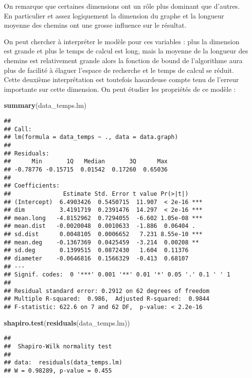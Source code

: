 \documentclass[
]{article}
\newenvironment{Shaded}{\begin{snugshade}}{\end{snugshade}}
\newcommand{\KeywordTok}[1]{\textcolor[rgb]{0.13,0.29,0.53}{\textbf{#1}}}
\newcommand{\NormalTok}[1]{#1}
\begin{document}
On remarque que certaines dimensions ont un rôle plus dominant que
d'autres. En particulier et assez logiquement la dimension du graphe et
la longueur moyenne des chemins ont une grosse influence sur le
résultat.

On peut chercher à interpréter le modèle pour ces variables : plus la
dimension est grande et plus le temps de calcul est long, mais la
moyenne de la longueur des chemins est relativement grande alors la
fonction de bound de l'algorithme aura plus de facilité à élaguer
l'espace de recherche et le temps de calcul se réduit. Cette deuxième
interprétation est toutefois hasardeuse compte tenu de l'erreur
importante sur cette dimension. On peut étudier les propriétés de ce
modèle :

\begin{Shaded}
\begin{Highlighting}[]
\KeywordTok{summary}\NormalTok{(data_temps.lm)}
\end{Highlighting}
\end{Shaded}

\begin{verbatim}
## 
## Call:
## lm(formula = data_temps ~ ., data = data.graph)
## 
## Residuals:
##      Min       1Q   Median       3Q      Max 
## -0.78776 -0.15715  0.01542  0.17260  0.65036 
## 
## Coefficients:
##               Estimate Std. Error t value Pr(>|t|)    
## (Intercept)  6.4903426  0.5450715  11.907  < 2e-16 ***
## dim          3.4191719  0.2391476  14.297  < 2e-16 ***
## mean.long   -4.8152962  0.7294055  -6.602 1.05e-08 ***
## mean.dist   -0.0020048  0.0010633  -1.886  0.06404 .  
## sd.dist      0.0048105  0.0006652   7.231 8.55e-10 ***
## mean.deg    -0.1367369  0.0425459  -3.214  0.00208 ** 
## sd.deg       0.1399515  0.0872430   1.604  0.11376    
## diameter    -0.0646816  0.1566329  -0.413  0.68107    
## ---
## Signif. codes:  0 '***' 0.001 '**' 0.01 '*' 0.05 '.' 0.1 ' ' 1
## 
## Residual standard error: 0.2912 on 62 degrees of freedom
## Multiple R-squared:  0.986,  Adjusted R-squared:  0.9844 
## F-statistic: 622.6 on 7 and 62 DF,  p-value: < 2.2e-16
\end{verbatim}

\begin{Shaded}
\begin{Highlighting}[]
\KeywordTok{shapiro.test}\NormalTok{(}\KeywordTok{residuals}\NormalTok{(data_temps.lm))}
\end{Highlighting}
\end{Shaded}

\begin{verbatim}
## 
##  Shapiro-Wilk normality test
## 
## data:  residuals(data_temps.lm)
## W = 0.98289, p-value = 0.455
\end{verbatim}
\end{document}
